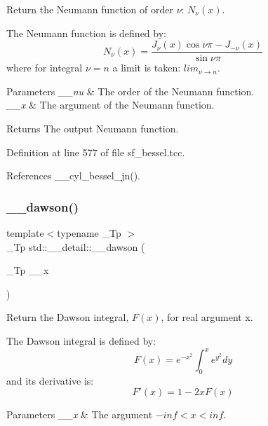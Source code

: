 Return the Neumann function of order $ \nu $\+: $ N_{\nu}(x) $. 

The Neumann function is defined by\+: \[ N_{\nu}(x) = \frac{J_{\nu}(x) \cos \nu\pi - J_{-\nu}(x)} {\sin \nu\pi} \] where for integral $ \nu = n $ a limit is taken\+: $ lim_{\nu \to n} $.


\begin{DoxyParams}{Parameters}
{\em \+\_\+\+\_\+nu} & The order of the Neumann function. \\
\hline
{\em \+\_\+\+\_\+x} & The argument of the Neumann function. \\
\hline
\end{DoxyParams}
\begin{DoxyReturn}{Returns}
The output Neumann function. 
\end{DoxyReturn}


Definition at line 577 of file sf\+\_\+bessel.\+tcc.



References \+\_\+\+\_\+cyl\+\_\+bessel\+\_\+jn().

\mbox{\label{namespacestd_1_1____detail_a6384fb4c5af31b41a38c120869a548c7}} 
\subsubsection{\texorpdfstring{\+\_\+\+\_\+dawson()}{\_\_dawson()}}
{\footnotesize\ttfamily template$<$typename \+\_\+\+Tp $>$ \\
\+\_\+\+Tp std\+::\+\_\+\+\_\+detail\+::\+\_\+\+\_\+dawson (\begin{DoxyParamCaption}\item[{\+\_\+\+Tp}]{\+\_\+\+\_\+x }\end{DoxyParamCaption})}



Return the Dawson integral, $ F(x) $, for real argument {\ttfamily x}. 

The Dawson integral is defined by\+: \[ F(x) = e^{-x^2} \int_0^x e^{y^2} dy \] and it\textquotesingle{}s derivative is\+: \[ F'(x) = 1 - 2xF(x) \]


\begin{DoxyParams}{Parameters}
{\em \+\_\+\+\_\+x} & The argument $ -inf < x < inf $. \\
\hline
\end{DoxyParams}


